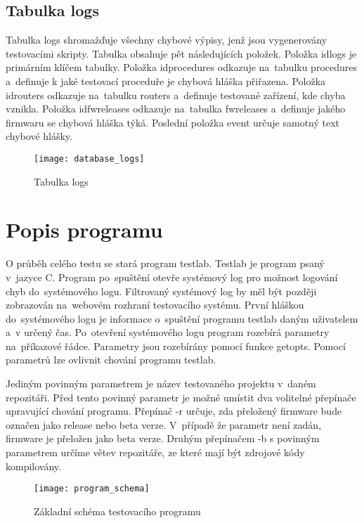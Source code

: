 \subsection{Tabulka logs}
Tabulka logs shromažďuje všechny chybové výpisy, jenž jsou vygenerovány testovacími skripty. Tabulka obsahuje pět následujících položek. Položka idlogs je primárním klíčem tabulky. Položka idprocedures odkazuje na~tabulku procedures a~definuje k jaké testovací proceduře je chybová hláška přiřazena. Položka idrouters odkazuje na~tabulku routers a~definuje testované zařízení, kde chyba vznikla. Položka idfwreleases odkazuje na~tabulka fwreleases a~definuje jakého firmwaru se chybová hláška týká. Poslední položka event určuje samotný text chybové hlášky.

\begin{figure}[h]
  \centering
  \texttt{[image: database\_logs]}
  \caption{Tabulka logs}
  \label{fig:database_logs}
\end{figure}

\section{Popis programu}

O průběh celého testu se stará program testlab. Testlab je program psaný v~jazyce C. Program po~spuštění otevře systémový log pro možnost logování chyb do~systémového logu. Filtrovaný systémový log by měl být později zobrazován na~webovém rozhraní testovacího systému. První hláškou do~systémového logu je informace o~spuštění programu testlab daným uživatelem a~v určený čas. Po~otevření systémového logu program rozebírá parametry na~příkazové řádce. Parametry jsou rozebírány pomocí funkce getopts. Pomocí parametrů lze ovlivnit chování programu testlab.

Jediným povinným parametrem je název testovaného projektu v~daném repozitáři. Před tento povinný parametr je možné umístit dva volitelné přepínače upravující chování programu. Přepínač -r určuje, zda přeložený firmware bude označen jako release nebo beta verze. V~případě že parametr není zadán, firmware je přeložen jako beta verze. Druhým přepínačem -b s povinným parametrem určíme větev repozitáře, ze které mají být zdrojové kódy kompilovány.

\begin{figure}[h]
  \centering
  \texttt{[image: program\_schema]}
  \caption{Základní schéma testovacího programu}
  \label{fig:program_schema}
\end{figure}

